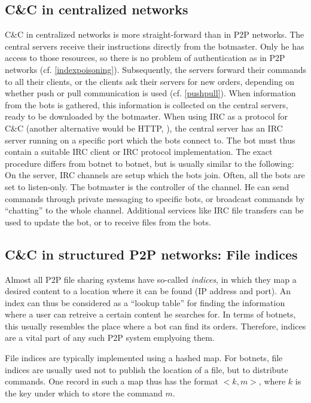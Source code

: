 \documentclass{llncs}
\begin{document}
\subsection{C\&C in centralized networks}
C\&C in centralized networks is more straight-forward than in P2P
networks. The central servers receive their instructions directly from
the botmaster. Only he has access to those resources, so there is no
problem of authentication as in P2P networks
(cf. \ref{indexpoisoning}). Subsequently, the servers forward their
commands to all their clients, or the clients ask their servers for
new orders, depending on whether push or pull communication is used
(cf. \ref{pushpull}). When information from the bots is gathered, this
information is collected on the central servers, ready to be
downloaded by the botmaster. When using IRC as a protocol for C\&C
(another alternative would be HTTP, \cite{li2009botnet}), the central
server has an IRC server running on a specific port which the bots
connect to. The bot must thus contain a suitable IRC client or IRC
protocol implementation. The exact procedure differs from botnet to
botnet, but is usually similar to the following: On the server, IRC
channels are setup which the bots join. Often, all the bots are set to
listen-only. The botmaster is the controller of the channel. He can
send commands through private messaging to specific bots, or broadcast
commands by ``chatting'' to the whole channel. Additional services
like IRC file transfers can be used to update the bot, or to receive
files from the bots.

\subsection{C\&C in structured P2P networks: File indices}
\label{distribution}
Almost all P2P file sharing systems have so-called {\it indices}, in
which they map a desired content to a location where it can be found
(IP address and port). An index can thus be considered as a ``lookup
table'' for finding the information where a user can retreive a
certain content he searches for. In terms of botnets, this usually
resembles the place where a bot can find its orders. Therefore,
indices are a vital part of any such P2P system emplyoing them.

File indices are typically implemented using a hashed map. For
botnets, file indices are usually used not to publish the location of
a file, but to distribute commands. One record in such a map thus has
the format $<k, m>$, where $k$ is the key under which to store the
command $m$.
\end{document}
